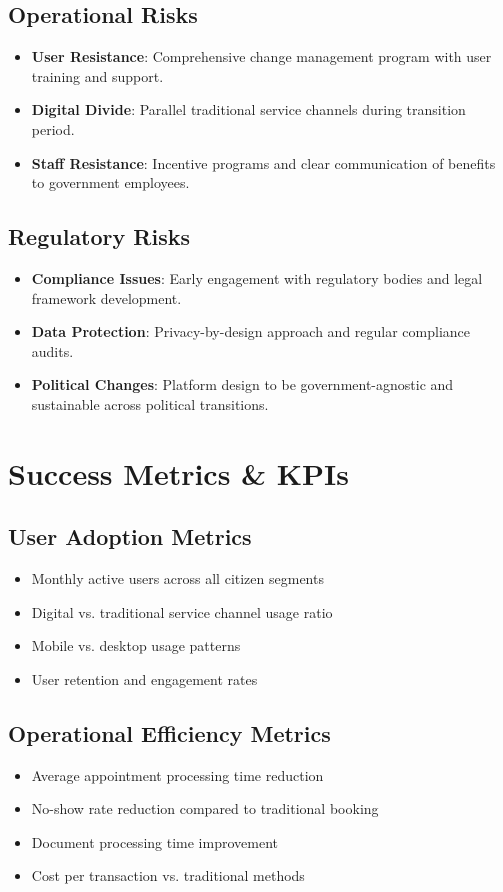 \documentclass[12pt,a4paper]{article}
\begin{document}
\subsection{Operational Risks}
\begin{itemize}[leftmargin=*]
    \item \textbf{User Resistance}: Comprehensive change management program with user training and support.
    \item \textbf{Digital Divide}: Parallel traditional service channels during transition period.
    \item \textbf{Staff Resistance}: Incentive programs and clear communication of benefits to government employees.
\end{itemize}

\subsection{Regulatory Risks}
\begin{itemize}[leftmargin=*]
    \item \textbf{Compliance Issues}: Early engagement with regulatory bodies and legal framework development.
    \item \textbf{Data Protection}: Privacy-by-design approach and regular compliance audits.
    \item \textbf{Political Changes}: Platform design to be government-agnostic and sustainable across political transitions.
\end{itemize}

\section{Success Metrics \& KPIs}

\subsection{User Adoption Metrics}
\begin{itemize}[leftmargin=*]
    \item Monthly active users across all citizen segments
    \item Digital vs. traditional service channel usage ratio
    \item Mobile vs. desktop usage patterns
    \item User retention and engagement rates
\end{itemize}

\subsection{Operational Efficiency Metrics}
\begin{itemize}[leftmargin=*]
    \item Average appointment processing time reduction
    \item No-show rate reduction compared to traditional booking
    \item Document processing time improvement
    \item Cost per transaction vs. traditional methods
\end{itemize}
\end{document}
